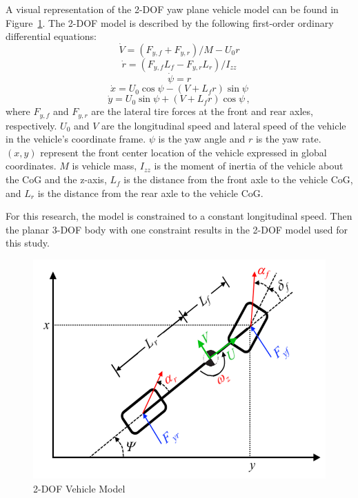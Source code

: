 \documentclass[12pt,onecolumn]{report}
\begin{document}
A visual representation of the 2-DOF yaw plane vehicle model can be found in Figure~\ref{fig:2DOF}. The 2-DOF model is described by the following first-order ordinary differential equations:
%
\begin{equation}\label{e:2DOF_Vdot}
\dot{V} = \left(F_{y,f} + F_{y,r}\right)/{M - U_0r} 
\end{equation}
\begin{equation}\label{e:2DOF_rdot}
\dot{r} = \left(F_{y,f}L_f - F_{y,r}L_r\right)/I_{zz}
\end{equation}
\begin{equation}\label{e:2DOF_psidot}
\dot{\psi} = r 
\end{equation}
\begin{equation}\label{e:2DOF_xdot}
\dot{x} = U_0\cos{\psi}-\left(V+L_fr\right)\sin{\psi}
\end{equation}
\begin{equation}\label{e:2DOF_ydot}
\dot{y} = U_0\sin{\psi}+\left(V+L_fr\right)\cos{\psi} \,,
\end{equation}
%
where $F_{y,f}$ and $F_{y,r}$ are the lateral tire forces at the front and rear axles, respectively. $U_0$ and $V$ are the longitudinal speed and lateral speed of the vehicle in the vehicle's coordinate frame. $\psi$ is the yaw angle and $r$ is the yaw rate. $\left(x,y\right)$ represent the front center location of the vehicle expressed in global coordinates. $M$ is vehicle mass, $I_{zz}$ is the moment of inertia of the vehicle about the CoG and the z-axis, $L_f$ is the distance from the front axle to the vehicle CoG, and $L_r$ is the distance from the rear axle to the vehicle CoG. 

For this research, the model is constrained to a constant longitudinal speed. Then the planar 3-DOF body with one constraint results in the 2-DOF model used for this study.

\begin{figure}
	\centering
	\includegraphics[width=0.8\columnwidth]{Figs/2DOF_haraus.png}
	\caption{\small 2-DOF Vehicle Model}  
	\label{fig:2DOF}
\end{figure}
\end{document}
